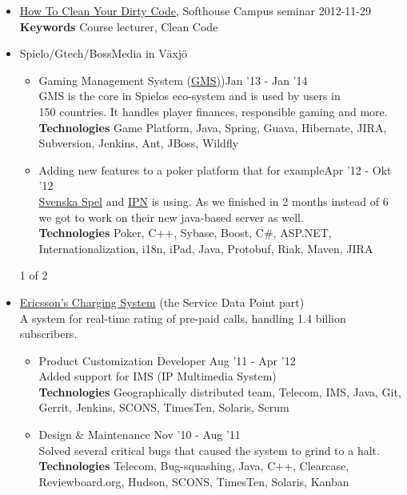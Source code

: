 \documentclass[overlapped]{res}
\begin{document}
\begin{resume}
\begin{itemize}
\item \href{https://github.com/jontejj/how-to-clean-your-dirty-code}{How To Clean Your Dirty Code}, Softhouse Campus seminar	\hfill 2012-11-29
	\\{\bf Keywords} Course lecturer, Clean Code
\\
\item Spielo/Gtech/BossMedia in Växjö
	\begin{itemize}
	\itemsep -1pt
	\item Gaming Management System (\href{http://www.spielog2.com/products/spielo-g2-gaming-management-system-(gms).aspx}{GMS)})\hfill Jan '13 - Jan '14
		\\GMS is the core in Spielos eco-system and is used  by users in
		\\150 countries. It handles player finances, responsible gaming and more.  
		\\{\bf Technologies} Game Platform, Java, Spring, Guava, Hibernate, JIRA, 
		\\Subversion, Jenkins, Ant, JBoss, Wildfly
	\itemsep -1pt
	\item Adding new features to a poker platform that for example\hfill Apr '12 - Okt '12 
	\\\href{http://www.svenskaspel.se/poker}{Svenska Spel} and \href{http://www.ipnpoker.com/}{IPN} is using. As we 	finished in 2 months instead of 6 
	\\we got to work on their new java-based server as well.
	\\{\bf Technologies} Poker, C++, Sybase, Boost, C\#, ASP.NET, 
	\\Internationalization, i18n, iPad, Java, Protobuf, Riak, Maven, JIRA
	\end{itemize}
\vspace{0.8cm}
\centerline{1 of 2}
\newpage

\item \href{http://www.ericsson.com/ourportfolio/telecom-operators/ericsson-charging-system?nav=marketcategory007%7Csubarea014}{Ericsson's Charging System} (the Service Data Point part)
	\\A system for real-time rating of pre-paid calls, handling 1.4 billion subscribers.
	\begin{itemize}
	\itemsep -1pt
 	\item Product Customization Developer \hfill Aug '11 - Apr '12
     		\\Added support for IMS (IP Multimedia System)
		\\{\bf Technologies} Geographically distributed team, Telecom, IMS, Java, Git,
		\\Gerrit, Jenkins, SCONS, TimesTen, Solaris, Scrum
 	\item Design \& Maintenance \hfill Nov '10 - Aug '11
     		\\Solved several critical bugs that caused the system to grind to a halt.
		\\{\bf Technologies} Telecom, Bug-squashing, Java, C++, Clearcase, 
		\\Reviewboard.org, Hudson, SCONS, TimesTen, Solaris, Kanban
	\end{itemize}
\end{itemize}


\end{resume}
\end{document}
